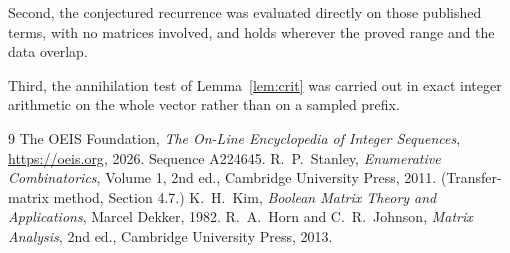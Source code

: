 \documentclass[11pt,a4paper]{article}
\theoremstyle{plain}
\theoremstyle{definition}
\begin{document}
Second, the conjectured recurrence was evaluated directly on those published terms, with no
matrices involved, and holds wherever the proved range and the data overlap.

Third, the annihilation test of Lemma~\ref{lem:crit} was carried out in exact integer
arithmetic on the whole vector rather than on a sampled prefix.

\begin{thebibliography}{9}
 The OEIS Foundation, \emph{The On-Line Encyclopedia of Integer
Sequences}, \url{https://oeis.org}, 2026. Sequence A224645.
 R.~P.~Stanley, \emph{Enumerative Combinatorics}, Volume 1, 2nd ed.,
Cambridge University Press, 2011. (Transfer-matrix method, Section 4.7.)
 K.~H.~Kim, \emph{Boolean Matrix Theory and Applications}, Marcel Dekker,
1982.
 R.~A.~Horn and C.~R.~Johnson, \emph{Matrix Analysis}, 2nd ed., Cambridge
University Press, 2013.
\end{thebibliography}
\end{document}
